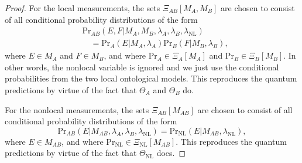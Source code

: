 \documentclass[DIV=calc,fontsize=12pt]{scrartcl} %
\theoremstyle{definition}
\theoremstyle{plain}
\begin{document}
\begin{proof}
For the local measurements, the sets $\Xi_{AB}[M_A,M_B]$ are chosen
to consist of all conditional probability distributions of the form
\begin{align}
&\text{Pr}_{AB}(E,F|M_A,M_B,\lambda_A,\lambda_B,\lambda_{\text{NL}})\nonumber\\
&\quad = \text{Pr}_A(E|M_A,\lambda_A) \text{Pr}_B(F|M_B,\lambda_B),
\end{align}
where $E \in M_A$ and $F \in M_B$, and where $\text{Pr}_A \in
\Xi_A[M_A]$ and $\text{Pr}_B \in \Xi_B[M_B]$.  In other words, the
nonlocal variable is ignored and we just use the conditional
probabilities from the two local ontological models.  This
reproduces the quantum predictions by virtue of the fact that
$\Theta_A$ and $\Theta_B$ do.

For the nonlocal measurements, the sets $\Xi_{AB}[M_{AB}]$ are
chosen to consist of all conditional probability distributions of
the form
\begin{equation}
\text{Pr}_{AB}(E|M_{AB},\lambda_A,\lambda_B,\lambda_{\text{NL}})
= \text{Pr}_{\text{NL}}(E|M_{AB},\lambda_{\text{NL}}),
\end{equation}
where $E \in M_{AB}$, and where $\text{Pr}_{\text{NL}} \in
\Xi_{\text{NL}}[M_{AB}]$.  This reproduces the quantum predictions
by virtue of the fact that $\Theta_{\text{NL}}$ does.
\end{proof}
\end{document}
